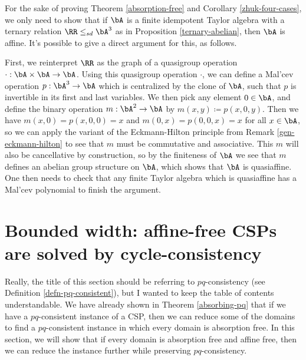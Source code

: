 \begin{rem} For the sake of proving Theorem \ref{absorption-free} and Corollary \ref{zhuk-four-cases}, we only need to show that if $\bA$ is a finite idempotent Taylor algebra with a ternary relation $\RR \le_{sd} \bA^3$ as in Proposition \ref{ternary-abelian}, then $\bA$ is affine. It's possible to give a direct argument for this, as follows.

First, we reinterpret $\RR$ as the graph of a quasigroup operation $\cdot : \bA \times \bA \rightarrow \bA$. Using this quasigroup operation $\cdot$, we can define a Mal'cev operation $p : \bA^3 \rightarrow \bA$ which is centralized by the clone of $\bA$, such that $p$ is invertible in its first and last variables. We then pick any element $0 \in \bA$, and define the binary operation $m : \bA^2 \rightarrow \bA$ by $m(x,y) \coloneqq p(x,0,y)$. Then we have $m(x,0) = p(x,0,0) = x$ and $m(0,x) = p(0,0,x) = x$ for all $x \in \bA$, so we can apply the variant of the Eckmann-Hilton principle from Remark \ref{gen-eckmann-hilton} to see that $m$ must be commutative and associative. This $m$ will also be cancellative by construction, so by the finiteness of $\bA$ we see that $m$ defines an abelian group structure on $\bA$, which shows that $\bA$ is quasiaffine. One then needs to check that any finite Taylor algebra which is quasiaffine has a Mal'cev polynomial to finish the argument.
\end{rem}




\section{Bounded width: affine-free CSPs are solved by cycle-consistency}

Really, the title of this section should be referring to $pq$-consistency (see Definition \ref{defn-pq-consistent}), but I wanted to keep the table of contents understandable. We have already shown in Theorem \ref{absorbing-pq} that if we have a $pq$-consistent instance of a CSP, then we can reduce some of the domains to find a $pq$-consistent instance in which every domain is absorption free. In this section, we will show that if every domain is absorption free and affine free, then we can reduce the instance further while preserving $pq$-consistency.

